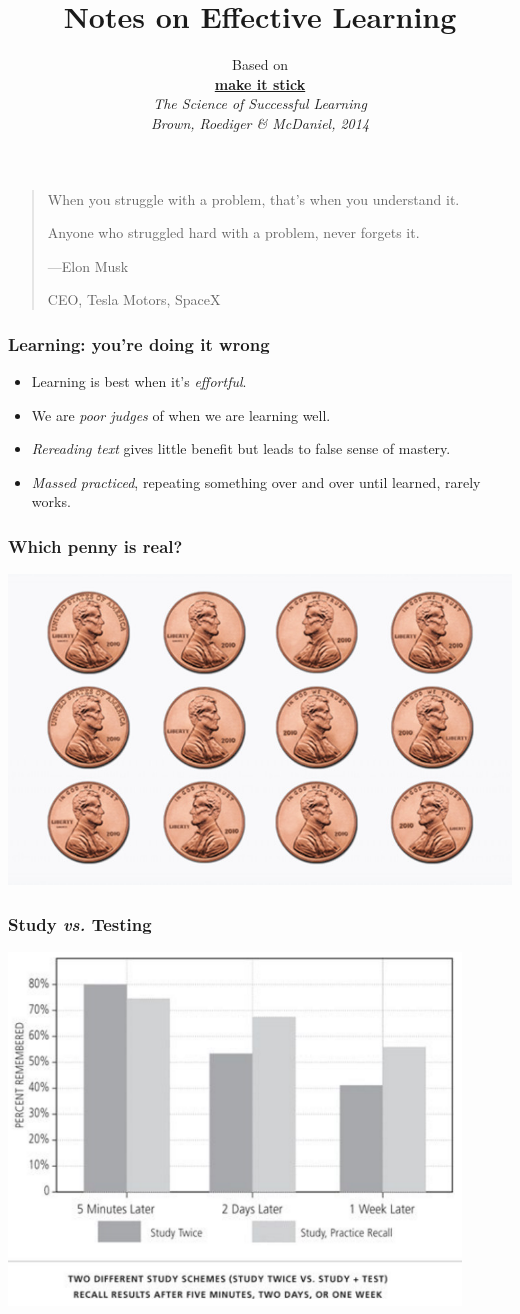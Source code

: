 \documentclass{beamer}
\title{Notes on Effective Learning}
\author{Based on\\
\href{http://makeitstick.net/}{\bf make it stick}\\
\em The Science of Successful Learning
\\\small Brown, Roediger \& McDaniel, 2014}
\newcommand{\bi}{\begin{itemize}}
\newcommand{\li}{\item}
\newcommand{\ei}{\end{itemize}}
\newcommand{\bfr}[1]{\begin{frame}[fragile]\frametitle{{ #1 }}}
\begin{document}
\begin{frame}
\maketitle

\end{frame}

\bfr{}
\begin{quotation}
When you struggle with a problem, that's when you understand it.

Anyone who struggled hard with a problem, never forgets it.

\hfill ---Elon Musk

\hfill CEO, Tesla Motors, SpaceX
\end{quotation}
\end{frame}

\bfr{Learning: you're doing it wrong}
\bi
\li Learning is best when it's {\em effortful}.
\li We are {\em poor judges} of when we are learning well.
\li {\em Rereading text} gives little benefit
but leads to false sense of mastery.
\li {\em Massed practiced}, repeating something over and over
until learned, rarely works.
\ei
\end{frame}

\bfr{Which penny is real?}
\includegraphics[width=\textwidth]{pennymemorytest.jpg}
\end{frame}

\bfr{Study {\em vs.} Testing}
\includegraphics[width=0.9\textwidth]{studyvstest.png}
\end{frame}
\end{document}
